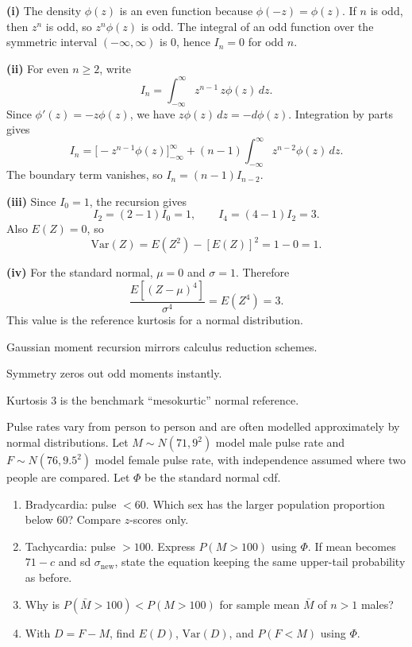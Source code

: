 \begin{solution}
\textbf{(i)} The density $\phi(z)$ is an even function because $\phi(-z)=\phi(z)$. If $n$ is odd, then $z^n$ is odd, so $z^n\phi(z)$ is odd. The integral of an odd function over the symmetric interval $(-\infty,\infty)$ is $0$, hence $I_n=0$ for odd $n$.

\textbf{(ii)} For even $n\ge2$, write
\[
I_n=\int_{-\infty}^{\infty}z^{n-1}\,z\phi(z)\,dz.
\]
Since $\phi'(z)=-z\phi(z)$, we have $z\phi(z)\,dz=-d\phi(z)$. Integration by parts gives
\[
I_n=\big[-z^{n-1}\phi(z)\big]_{-\infty}^{\infty}
+(n-1)\int_{-\infty}^{\infty}z^{n-2}\phi(z)\,dz.
\]
The boundary term vanishes, so $I_n=(n-1)I_{n-2}$.

\textbf{(iii)} Since $I_0=1$, the recursion gives
\[
I_2=(2-1)I_0=1,\qquad I_4=(4-1)I_2=3.
\]
Also $E(Z)=0$, so
\[
\mathrm{Var}(Z)=E(Z^2)-[E(Z)]^2=1-0=1.
\]

\textbf{(iv)} For the standard normal, $\mu=0$ and $\sigma=1$. Therefore
\[
\frac{E[(Z-\mu)^4]}{\sigma^4}=E(Z^4)=\boxed{3}.
\]
This value is the reference kurtosis for a normal distribution.
\end{solution}

\begin{takeaways}
\item Gaussian moment recursion mirrors calculus reduction schemes.
\item Symmetry zeros out odd moments instantly.
\item Kurtosis $3$ is the benchmark ``mesokurtic'' normal reference.
\end{takeaways}

\begin{problem}
Pulse rates vary from person to person and are often modelled approximately by normal distributions. Let $M\sim N(71,9^{2})$ model male pulse rate and $F\sim N(76,9{.}5^{2})$ model female pulse rate, with independence assumed where two people are compared. Let $\Phi$ be the standard normal cdf.
\begin{enumerate}[label=\textbf{(\roman*)}]
  \item Bradycardia: pulse $<60$. Which sex has the larger population proportion below $60$? Compare $z$-scores only.
  \item Tachycardia: pulse $>100$. Express $P(M>100)$ using $\Phi$. If mean becomes $71-c$ and sd $\sigma_{\mathrm{new}}$, state the equation keeping the same upper-tail probability as before.
  \item Why is $P(\bar{M}>100)<P(M>100)$ for sample mean $\bar{M}$ of $n>1$ males?
  \item With $D=F-M$, find $E(D)$, $\mathrm{Var}(D)$, and $P(F<M)$ using $\Phi$.
\end{enumerate}
\end{problem}


